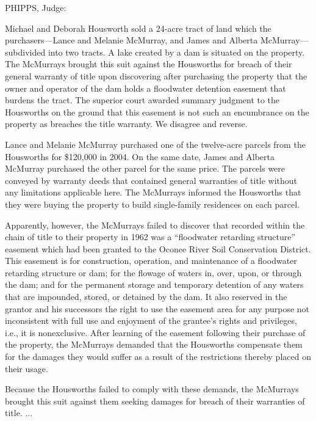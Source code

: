 

\textsc{PHIPPS}, Judge: 

Michael and Deborah Housworth sold a 24-acre tract of land which the
purchasers---Lance and Melanie McMurray, and James and Alberta McMurray---
subdivided into two tracts. A lake created by a dam is situated on the
property. The McMurrays brought this suit against the Housworths for breach of
their general warranty of title upon discovering after purchasing the property
that the owner and operator of the dam holds a floodwater detention easement
that burdens the tract. The superior court awarded summary judgment to the
Housworths on the ground that this easement is not such an encumbrance on the
property as breaches the title warranty. We disagree and reverse. 

Lance and Melanie McMurray purchased one of the twelve-acre parcels from the
Housworths for \$120,000 in 2004. On the same date, James and Alberta McMurray
purchased the other parcel for the same price. The parcels were conveyed by
warranty deeds that contained general warranties of title without any
limitations applicable here. The McMurrays informed the Housworths that they
were buying the property to build single-family residences on each parcel. 

Apparently, however, the McMurrays failed to discover that recorded within the
chain of title to their property in 1962 was a ``floodwater retarding
structure'' easement which had been granted to the Oconee River Soil
Conservation District. This easement is for construction, operation, and
maintenance of a floodwater retarding structure or dam; for the flowage of
waters in, over, upon, or through the dam; and for the permanent storage and
temporary detention of any waters that are impounded, stored, or detained by
the dam. It also reserved in the grantor and his successors the right to use
the easement area for any purpose not inconsistent with full use and enjoyment
of the grantee's rights and privileges, i.e., it is nonexclusive. After
learning of the easement following their purchase of the property, the
McMurrays demanded that the Housworths compensate them for the damages they
would suffer as a result of the restrictions thereby placed on their usage. 

Because the Housworths failed to comply with these demands, the McMurrays
brought this suit against them seeking damages for breach of their warranties
of title. ... 

